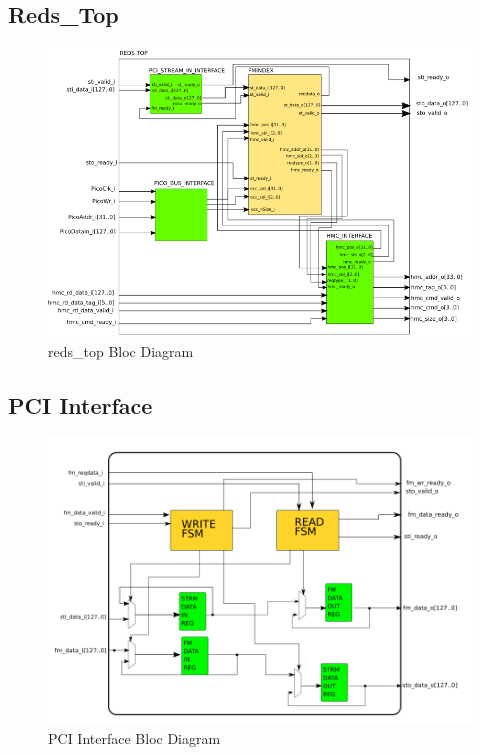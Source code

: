 \subsection{Reds\_Top}
\begin{figure}[H]
    \centering
    \includegraphics[scale = 0.55]{Figures/REDS_TOP_DIAG.png}
    \caption{reds\_top Bloc Diagram}
    \label{fig:reds_top_diag}
\end{figure}

\subsection{PCI Interface}

\begin{figure}[H]
    \centering
    \includegraphics[scale = 0.4]{Figures/PCI_INTFCE_DIAG.png}
    \caption{PCI Interface Bloc Diagram}
    \label{fig:pci_diag}
\end{figure}

